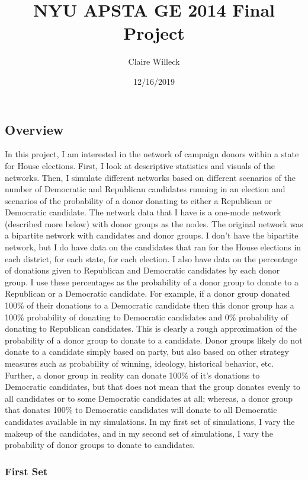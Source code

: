 \documentclass[]{article}
\title{NYU APSTA GE 2014 Final Project}
\author{Claire Willeck}
\date{12/16/2019}
\begin{document}
\maketitle

\subsection{Overview}\label{overview}

In this project, I am interested in the network of campaign donors
within a state for House elections. First, I look at descriptive
statistics and visuals of the networks. Then, I simulate different
networks based on different scenarios of the number of Democratic and
Republican candidates running in an election and scenarios of the
probability of a donor donating to either a Republican or Democratic
candidate. The network data that I have is a one-mode network (described
more below) with donor groups as the nodes. The original network was a
bipartite network with candidates and donor groups. I don't have the
bipartite network, but I do have data on the candidates that ran for the
House elections in each district, for each state, for each election. I
also have data on the percentage of donations given to Republican and
Democratic candidates by each donor group. I use these percentages as
the probability of a donor group to donate to a Republican or a
Democratic candidate. For example, if a donor group donated 100\% of
their donations to a Democratic candidate then this donor group has a
100\% probability of donating to Democratic candidates and 0\%
probability of donating to Republican candidates. This is clearly a
rough approximation of the probability of a donor group to donate to a
candidate. Donor groups likely do not donate to a candidate simply based
on party, but also based on other strategy measures such as probability
of winning, ideology, historical behavior, etc. Further, a donor group
in reality can donate 100\% of it's donations to Democratic candidates,
but that does not mean that the group donates evenly to all candidates
or to some Democratic candidates at all; whereas, a donor group that
donates 100\% to Democratic candidates will donate to all Democratic
candidates available in my simulations. In my first set of simulations,
I vary the makeup of the candidates, and in my second set of
simulations, I vary the probability of donor groups to donate to
candidates.

\subsubsection{First Set}\label{first-set}
\end{document}
